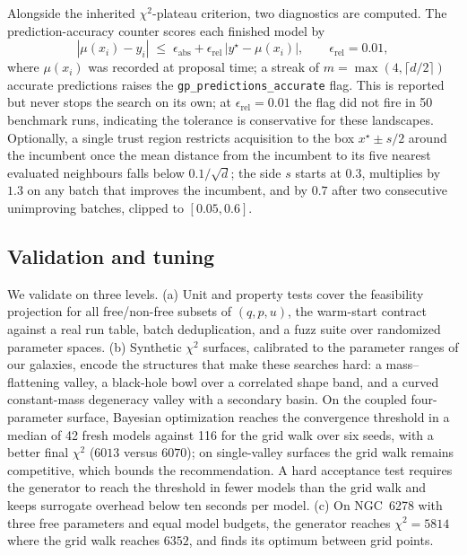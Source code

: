 Alongside the inherited $\chi^2$-plateau criterion, two diagnostics are
computed. The prediction-accuracy counter \citep[CorrectCounter;
][]{elgammal2023gpry} scores each finished model by
\begin{equation}
  |\mu(x_i) - y_i| \;\le\; \epsilon_\mathrm{abs} +
  \epsilon_\mathrm{rel}\,\bigl|y^\star - \mu(x_i)\bigr|,
  \qquad \epsilon_\mathrm{rel} = 0.01,
\end{equation}
where $\mu(x_i)$ was recorded at proposal time; a streak of
$m = \max(4, \lceil d/2 \rceil)$ accurate predictions raises the
\texttt{gp\_predictions\_accurate} flag. This is reported but never
stops the search on its own; at $\epsilon_\mathrm{rel}=0.01$ the flag
did not fire in 50 benchmark runs, indicating the tolerance is
conservative for these landscapes. Optionally, a single trust region
\citep[TuRBO-style;][]{eriksson2019turbo} restricts acquisition to the
box $x^\star \pm s/2$ around the incumbent once the mean distance from
the incumbent to its five nearest evaluated neighbours falls below
$0.1/\sqrt{d}$; the side $s$ starts at $0.3$, multiplies by $1.3$ on any
batch that improves the incumbent, and by $0.7$ after two consecutive
unimproving batches, clipped to $[0.05, 0.6]$.

\subsection{Validation and tuning}
\label{app:bayesopt:valid}
We validate on three levels. (a) Unit and property tests cover the
feasibility projection for all free/non-free subsets of $(q,p,u)$, the
warm-start contract against a real run table, batch deduplication, and a
fuzz suite over randomized parameter spaces. (b) Synthetic $\chi^2$
surfaces, calibrated to the parameter ranges of our galaxies, encode the
structures that make these searches hard: a mass--flattening valley, a
black-hole bowl over a correlated shape band, and a curved
constant-mass degeneracy valley with a secondary basin. On the coupled
four-parameter surface, Bayesian optimization reaches the convergence
threshold in a median of 42 fresh models against 116 for the grid walk
over six seeds, with a better final $\chi^2$ ($6013$ versus $6070$); on
single-valley surfaces the grid walk remains competitive, which bounds
the recommendation. A hard acceptance test requires the generator to
reach the threshold in fewer models than the grid walk and keeps
surrogate overhead below ten seconds per model. (c) On NGC~6278 with
three free parameters and equal model budgets, the generator reaches
$\chi^2 = 5814$ where the grid walk reaches $6352$, and finds its
optimum between grid points.

